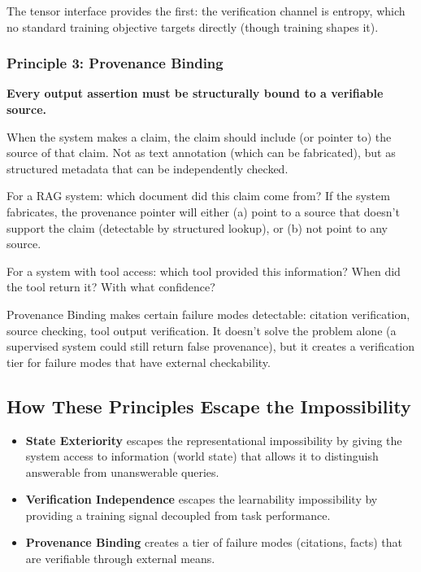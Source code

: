 \documentclass[11pt]{article}
\begin{document}
The tensor interface provides the first: the verification channel is entropy, which no standard training objective targets directly (though training shapes it).

\subsubsection{Principle 3: Provenance Binding}

\textbf{Every output assertion must be structurally bound to a verifiable source.}

When the system makes a claim, the claim should include (or pointer to) the source of that claim. Not as text annotation (which can be fabricated), but as structured metadata that can be independently checked.

For a RAG system: which document did this claim come from? If the system fabricates, the provenance pointer will either (a) point to a source that doesn't support the claim (detectable by structured lookup), or (b) not point to any source.

For a system with tool access: which tool provided this information? When did the tool return it? With what confidence?

Provenance Binding makes certain failure modes detectable: citation verification, source checking, tool output verification. It doesn't solve the problem alone (a supervised system could still return false provenance), but it creates a verification tier for failure modes that have external checkability.

\subsection{How These Principles Escape the Impossibility}

\begin{itemize}
    \item \textbf{State Exteriority} escapes the representational impossibility by giving the system access to information (world state) that allows it to distinguish answerable from unanswerable queries.
    \item \textbf{Verification Independence} escapes the learnability impossibility by providing a training signal decoupled from task performance.
    \item \textbf{Provenance Binding} creates a tier of failure modes (citations, facts) that are verifiable through external means.
\end{itemize}
\end{document}
